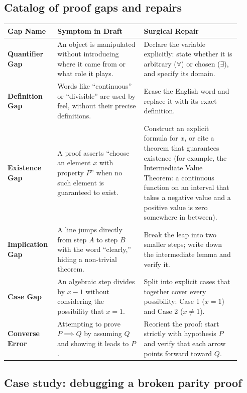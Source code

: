 \subsection{Catalog of proof gaps and repairs}

\begin{longtable}{p{0.18\linewidth}p{0.35\linewidth}p{0.39\linewidth}}
\toprule
\textbf{Gap Name} & \textbf{Symptom in Draft} & \textbf{Surgical Repair} \\
\midrule
\textbf{Quantifier Gap} & An object is manipulated without introducing where it came from or what role it plays. & Declare the variable explicitly: state whether it is arbitrary ($\forall$) or chosen ($\exists$), and specify its domain. \\
\addlinespace
\textbf{Definition Gap} & Words like ``continuous'' or ``divisible'' are used by feel, without their precise definitions. & Erase the English word and replace it with its exact definition. \\
\addlinespace
\textbf{Existence Gap} & A proof asserts ``choose an element $x$ with property $P$'' when no such element is guaranteed to exist. & Construct an explicit formula for $x$, or cite a theorem that guarantees existence (for example, the Intermediate Value Theorem: a continuous function on an interval that takes a negative value and a positive value is zero somewhere in between). \\
\addlinespace
\textbf{Implication Gap} & A line jumps directly from step $A$ to step $B$ with the word ``clearly,'' hiding a non-trivial theorem. & Break the leap into two smaller steps; write down the intermediate lemma and verify it. \\
\addlinespace
\textbf{Case Gap} & An algebraic step divides by $x - 1$ without considering the possibility that $x = 1$. & Split into explicit cases that together cover every possibility: Case 1 ($x = 1$) and Case 2 ($x \neq 1$). \\
\addlinespace
\textbf{Converse Error} & Attempting to prove $P \implies Q$ by assuming $Q$ and showing it leads to $P$. & Reorient the proof: start strictly with hypothesis $P$ and verify that each arrow points forward toward $Q$. \\
\bottomrule
\end{longtable}

\subsection{Case study: debugging a broken parity proof}

